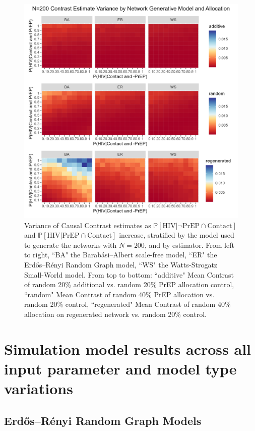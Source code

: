 \documentclass{article}
\theoremstyle{definition}
\begin{document}
\begin{figure}[H]
    \centering
    \includegraphics[width=\linewidth]{Figures/Large N Generative Model Variance plots.png}
    \caption{Variance of Causal Contrast estimates as $\mathbb{P}\left[\text{HIV} \vert \neg \text{PrEP} \cap \text{Contact}\right]$ and $\mathbb{P}\left[\text{HIV} \vert \text{PrEP} \cap \text{Contact}\right]$ increase, stratified by the model used to generate the networks with $N=200$, and by estimator. From left to right, ``BA" the Barabási–Albert scale-free model, ``ER" the Erdős–Rényi Random Graph model, ``WS" the Watts-Strogatz Small-World model. From top to bottom: ``additive" Mean Contrast of random 20\% additional vs. random 20\% PrEP allocation control, ``random" Mean Contrast of random 40\% PrEP allocation vs. random 20\% control, ``regenerated" Mean Contrast of random 40\% allocation on regenerated network vs. random 20\% control.}
    \label{fig:E2}
\end{figure}

\newpage
\section{Simulation model results across all input parameter and model type variations}
\label{sec: F}

\subsection{Erdős–Rényi  Random Graph Models}
\end{document}
